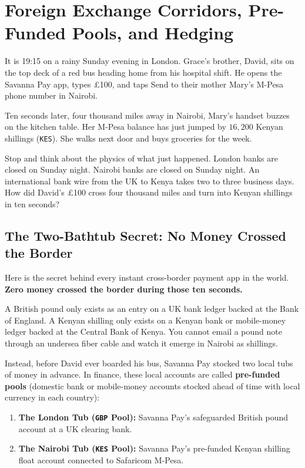 \chapter{Foreign Exchange Corridors, Pre-Funded Pools, and Hedging}
\label{ch:fx-corridors}
\chapterline

It is 19:15 on a rainy Sunday evening in London. Grace's brother, David, sits on the top deck of a red bus heading home from his hospital shift. He opens the Savanna Pay app, types \pounds 100, and taps Send to their mother Mary's M-Pesa phone number in Nairobi.

Ten seconds later, four thousand miles away in Nairobi, Mary's handset buzzes on the kitchen table. Her M-Pesa balance has just jumped by $16{,}200$ Kenyan shillings (\texttt{KES}). She walks next door and buys groceries for the week.

Stop and think about the physics of what just happened. London banks are closed on Sunday night. Nairobi banks are closed on Sunday night. An international bank wire from the UK to Kenya takes two to three business days. How did David's \pounds 100 cross four thousand miles and turn into Kenyan shillings in ten seconds?

\section{The Two-Bathtub Secret: No Money Crossed the Border}

Here is the secret behind every instant cross-border payment app in the world. \textbf{Zero money crossed the border during those ten seconds.}

A British pound only exists as an entry on a UK bank ledger backed at the Bank of England. A Kenyan shilling only exists on a Kenyan bank or mobile-money ledger backed at the Central Bank of Kenya. You cannot email a pound note through an undersea fiber cable and watch it emerge in Nairobi as shillings.

Instead, before David ever boarded his bus, Savanna Pay stocked two local tubs of money in advance. In finance, these local accounts are called \textbf{pre-funded pools} (domestic bank or mobile-money accounts stocked ahead of time with local currency in each country):
\begin{enumerate}
  \item \textbf{The London Tub (\texttt{GBP} Pool):} Savanna Pay's safeguarded British pound account at a UK clearing bank.
  \item \textbf{The Nairobi Tub (\texttt{KES} Pool):} Savanna Pay's pre-funded Kenyan shilling float account connected to Safaricom M-Pesa.
\end{enumerate}

